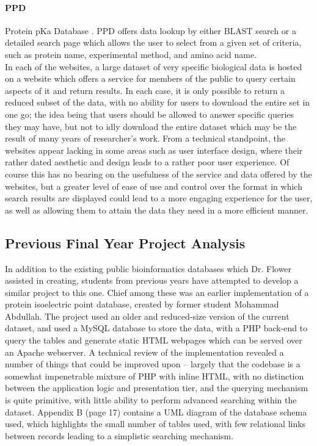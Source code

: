 \paragraph{PPD} Protein pKa Database \cite{DDGNDa}. PPD offers data lookup by
either BLAST search or a detailed search page which allows the user to select
from a given set of criteria, such as protein name, experimental method, and
amino acid name.\\

In each of the websites, a large dataset of very specific biological data is
hosted on a website which offers a service for members of the public to query
certain aspects of it and return results. In each case, it is only possible to
return a reduced subset of the data, with no ability for users to download the
entire set in one go; the idea being that users should be allowed to answer
specific queries they may have, but not to idly download the entire dataset
which may be the result of many years of researcher's work. From a technical
standpoint, the websites appear lacking in some areas such as user interface
design, where their rather dated aesthetic and design leads to a rather poor
user experience. Of course this has no bearing on the usefulness of the service
and data offered by the websites, but a greater level of ease of use and control
over the format in which search results are displayed could lead to a more
engaging experience for the user, as well as allowing them to attain the data
they need in a more efficient manner.

\subsection{Previous Final Year Project Analysis}

In addition to the existing public bioinformatics databases which Dr. Flower
assisted in creating, students from previous years have attempted to develop a
similar project to this one. Chief among these was an earlier implementation of
a protein isoelectric point database, created by former student Mohammad
Abdullah. The project used an older and reduced-size version of the current
dataset, and used a MySQL database to store the data, with a PHP back-end to
query the tables and generate static HTML webpages which can be served over an
Apache webserver. A technical review of the implementation revealed a number of
things that could be improved upon – largely that the codebase is a somewhat
impenetrable mixture of PHP with inline HTML, with no distinction between the
application logic and presentation tier, and the querying mechanism is quite
primitive, with little ability to perform advanced searching within the
dataset. Appendix B (page 17) contains a UML diagram of the database schema
used, which highlights the small number of tables used, with few relational
links between records leading to a simplistic searching mechanism.
